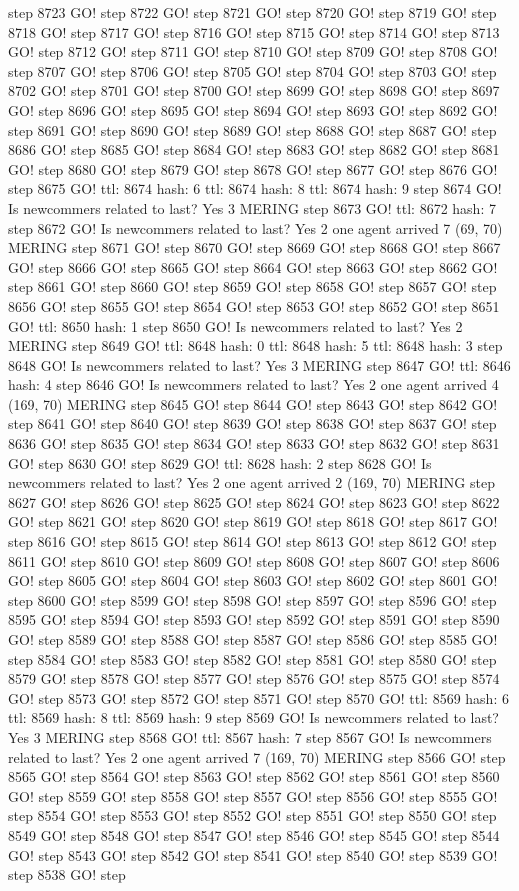 step 8723 GO! step 8722 GO! step 8721 GO! step 8720 GO! step 8719 GO! step 8718 GO! step 8717 GO! step 8716 GO! step 8715 GO! step 8714 GO! step 8713 GO! step 8712 GO! step 8711 GO! step 8710 GO! step 8709 GO! step 8708 GO! step 8707 GO! step 8706 GO! step 8705 GO! step 8704 GO! step 8703 GO! step 8702 GO! step 8701 GO! step 8700 GO! step 8699 GO! step 8698 GO! step 8697 GO! step 8696 GO! step 8695 GO! step 8694 GO! step 8693 GO! step 8692 GO! step 8691 GO! step 8690 GO! step 8689 GO! step 8688 GO! step 8687 GO! step 8686 GO! step 8685 GO! step 8684 GO! step 8683 GO! step 8682 GO! step 8681 GO! step 8680 GO! step 8679 GO! step 8678 GO! step 8677 GO! step 8676 GO! step 8675 GO! ttl: 8674 hash: 6 ttl: 8674 hash: 8 ttl: 8674 hash: 9 step 8674 GO! Is newcommers related to last? Yes 3 MERING step 8673 GO! ttl: 8672 hash: 7 step 8672 GO! Is newcommers related to last? Yes 2 one agent arrived 7 (69, 70) MERING step 8671 GO! step 8670 GO! step 8669 GO! step 8668 GO! step 8667 GO! step 8666 GO! step 8665 GO! step 8664 GO! step 8663 GO! step 8662 GO! step 8661 GO! step 8660 GO! step 8659 GO! step 8658 GO! step 8657 GO! step 8656 GO! step 8655 GO! step 8654 GO! step 8653 GO! step 8652 GO! step 8651 GO! ttl: 8650 hash: 1 step 8650 GO! Is newcommers related to last? Yes 2 MERING step 8649 GO! ttl: 8648 hash: 0 ttl: 8648 hash: 5 ttl: 8648 hash: 3 step 8648 GO! Is newcommers related to last? Yes 3 MERING step 8647 GO! ttl: 8646 hash: 4 step 8646 GO! Is newcommers related to last? Yes 2 one agent arrived 4 (169, 70) MERING step 8645 GO! step 8644 GO! step 8643 GO! step 8642 GO! step 8641 GO! step 8640 GO! step 8639 GO! step 8638 GO! step 8637 GO! step 8636 GO! step 8635 GO! step 8634 GO! step 8633 GO! step 8632 GO! step 8631 GO! step 8630 GO! step 8629 GO! ttl: 8628 hash: 2 step 8628 GO! Is newcommers related to last? Yes 2 one agent arrived 2 (169, 70) MERING step 8627 GO! step 8626 GO! step 8625 GO! step 8624 GO! step 8623 GO! step 8622 GO! step 8621 GO! step 8620 GO! step 8619 GO! step 8618 GO! step 8617 GO! step 8616 GO! step 8615 GO! step 8614 GO! step 8613 GO! step 8612 GO! step 8611 GO! step 8610 GO! step 8609 GO! step 8608 GO! step 8607 GO! step 8606 GO! step 8605 GO! step 8604 GO! step 8603 GO! step 8602 GO! step 8601 GO! step 8600 GO! step 8599 GO! step 8598 GO! step 8597 GO! step 8596 GO! step 8595 GO! step 8594 GO! step 8593 GO! step 8592 GO! step 8591 GO! step 8590 GO! step 8589 GO! step 8588 GO! step 8587 GO! step 8586 GO! step 8585 GO! step 8584 GO! step 8583 GO! step 8582 GO! step 8581 GO! step 8580 GO! step 8579 GO! step 8578 GO! step 8577 GO! step 8576 GO! step 8575 GO! step 8574 GO! step 8573 GO! step 8572 GO! step 8571 GO! step 8570 GO! ttl: 8569 hash: 6 ttl: 8569 hash: 8 ttl: 8569 hash: 9 step 8569 GO! Is newcommers related to last? Yes 3 MERING step 8568 GO! ttl: 8567 hash: 7 step 8567 GO! Is newcommers related to last? Yes 2 one agent arrived 7 (169, 70) MERING step 8566 GO! step 8565 GO! step 8564 GO! step 8563 GO! step 8562 GO! step 8561 GO! step 8560 GO! step 8559 GO! step 8558 GO! step 8557 GO! step 8556 GO! step 8555 GO! step 8554 GO! step 8553 GO! step 8552 GO! step 8551 GO! step 8550 GO! step 8549 GO! step 8548 GO! step 8547 GO! step 8546 GO! step 8545 GO! step 8544 GO! step 8543 GO! step 8542 GO! step 8541 GO! step 8540 GO! step 8539 GO! step 8538 GO! step 